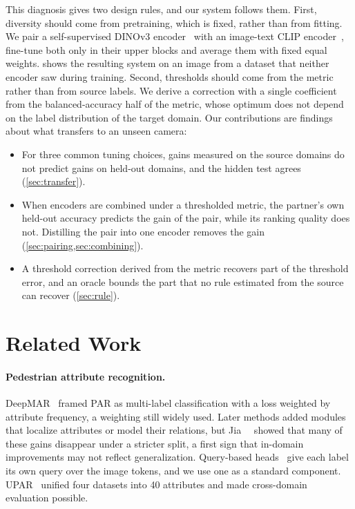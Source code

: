 \documentclass[10pt,twocolumn,letterpaper]{article}
\begin{document}
This diagnosis gives two design rules, and our system follows them. First, diversity should come from pretraining, which is fixed, rather than from fitting. We pair a self-supervised DINOv3 encoder~\cite{dinov3} with an image-text CLIP encoder~\cite{clip}, fine-tune both only in their upper blocks and average them with fixed equal weights.  shows the resulting system on an image from a dataset that neither encoder saw during training. Second, thresholds should come from the metric rather than from source labels. We derive a correction with a single coefficient from the balanced-accuracy half of the metric, whose optimum does not depend on the label distribution of the target domain. Our contributions are findings about what transfers to an unseen camera:
\begin{itemize}
\item For three common tuning choices, gains measured on the source domains do not predict gains on held-out domains, and the hidden test agrees (\cref{sec:transfer}).
\item When encoders are combined under a thresholded metric, the partner's own held-out accuracy predicts the gain of the pair, while its ranking quality does not. Distilling the pair into one encoder removes the gain (\cref{sec:pairing,sec:combining}).
\item A threshold correction derived from the metric recovers part of the threshold error, and an oracle bounds the part that no rule estimated from the source can recover (\cref{sec:rule}).
\end{itemize}


\section{Related Work}
\label{sec:related}

\paragraph{Pedestrian attribute recognition.} DeepMAR~\cite{deepmar} framed PAR as multi-label classification with a loss weighted by attribute frequency, a weighting still widely used. Later methods added modules that localize attributes or model their relations, but Jia~\etal~\cite{rethinkpar} showed that many of these gains disappear under a stricter split, a first sign that in-domain improvements may not reflect generalization. Query-based heads~\cite{q2l,mldecoder} give each label its own query over the image tokens, and we use one as a standard component. UPAR~\cite{upar} unified four datasets into 40 attributes and made cross-domain evaluation possible.
\end{document}
